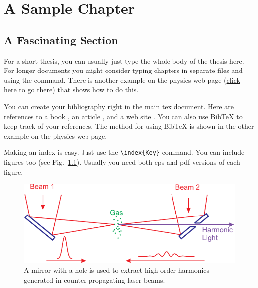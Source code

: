\documentclass[etd,oneside,senior]{BYUPhys}
\begin{document}
 \frontmatter

 \makepreliminarypages

 \tableofcontents

 \mainmatter


\chapter{A Sample Chapter}

\section{A Fascinating Section}
\label{sec:meaningfulname}

For a short thesis, you can usually just type the whole body of the thesis
here.  For longer documents you might consider typing chapters in separate
files and using the \verb|| command. There is another example on the
physics web page
(\href{https://physics.byu.edu/undergraduate/latex.aspx}{click here to go
there}) that shows how to do this.

You can create your bibliography right in the main tex document.
Here are references to a book \cite{Jackson1998}, an article
\cite{Peatross2000}, and a web site \cite{intel}. You can also use
BibTeX to keep track of your references.  The method for using
BibTeX is shown in the other example on the physics web page.

Making an index is easy. Just use the \verb|\index{Key}| command.
 You can include figures too (see
Fig.~\ref{fig:MirrorDiagram}).  Usually you need both eps and pdf
versions of each figure.
\begin{figure}
    \centerline{\includegraphics{Graphic1}}
    \caption[Setup for using counter-propagating light]{\label{fig:MirrorDiagram}
    A mirror with a hole is used to extract high-order harmonics generated in
    counter-propagating laser beams.}
\end{figure}
\end{document}
